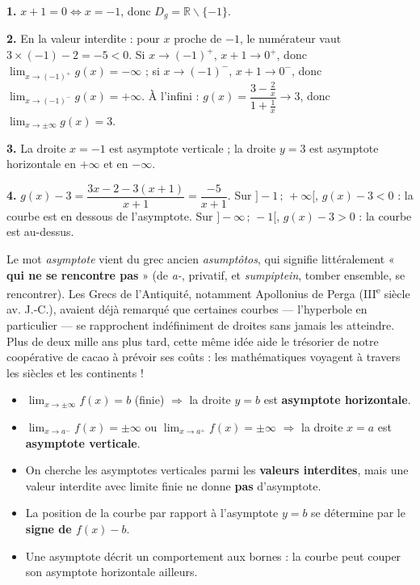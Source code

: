 \documentclass[11pt]{article}
\def\setminus{\mathbin{\backslash}}\let\smallsetminus\setminus
\begin{document}
\begin{corrige}[Exercice 1]
\textbf{1.} $x + 1 = 0 \Leftrightarrow x = -1$, donc $D_g = \mathbb{R} \setminus \{-1\}$.

\textbf{2.} En la valeur interdite : pour $x$ proche de $-1$, le numérateur vaut $3 \times (-1) - 2 = -5 < 0$. Si $x \to (-1)^+$, $x+1 \to 0^+$, donc $\lim_{x \to (-1)^+} g(x) = -\infty$ ; si $x \to (-1)^-$, $x+1 \to 0^-$, donc $\lim_{x \to (-1)^-} g(x) = +\infty$. À l'infini : $g(x) = \dfrac{3 - \frac{2}{x}}{1 + \frac{1}{x}} \to 3$, donc $\lim_{x \to \pm\infty} g(x) = 3$.

\textbf{3.} La droite $x = -1$ est asymptote verticale ; la droite $y = 3$ est asymptote horizontale en $+\infty$ et en $-\infty$.

\textbf{4.} $g(x) - 3 = \dfrac{3x - 2 - 3(x+1)}{x+1} = \dfrac{-5}{x+1}$. Sur $]-1\,;\,+\infty[$, $g(x) - 3 < 0$ : la courbe est en dessous de l'asymptote. Sur $]-\infty\,;\,-1[$, $g(x) - 3 > 0$ : la courbe est au-dessus.
\end{corrige}

\begin{savaistu}
Le mot \emph{asymptote} vient du grec ancien \emph{asumptôtos}, qui signifie littéralement « \textbf{qui ne se rencontre pas} » (de \emph{a-}, privatif, et \emph{sumpiptein}, tomber ensemble, se rencontrer). Les Grecs de l'Antiquité, notamment Apollonius de Perga (III\textsuperscript{e} siècle av. J.-C.), avaient déjà remarqué que certaines courbes — l'hyperbole en particulier — se rapprochent indéfiniment de droites sans jamais les atteindre. Plus de deux mille ans plus tard, cette même idée aide le trésorier de notre coopérative de cacao à prévoir ses coûts : les mathématiques voyagent à travers les siècles et les continents !
\end{savaistu}

\begin{aretenir}
\begin{itemize}
\item $\lim_{x \to \pm\infty} f(x) = b$ (finie) $\Rightarrow$ la droite $y = b$ est \textbf{asymptote horizontale}.
\item $\lim_{x \to a^-} f(x) = \pm\infty$ ou $\lim_{x \to a^+} f(x) = \pm\infty$ $\Rightarrow$ la droite $x = a$ est \textbf{asymptote verticale}.
\item On cherche les asymptotes verticales parmi les \textbf{valeurs interdites}, mais une valeur interdite avec limite finie ne donne \textbf{pas} d'asymptote.
\item La position de la courbe par rapport à l'asymptote $y = b$ se détermine par le \textbf{signe de $f(x) - b$}.
\item Une asymptote décrit un comportement aux bornes : la courbe peut couper son asymptote horizontale ailleurs.
\end{itemize}
\end{aretenir}
\end{document}
